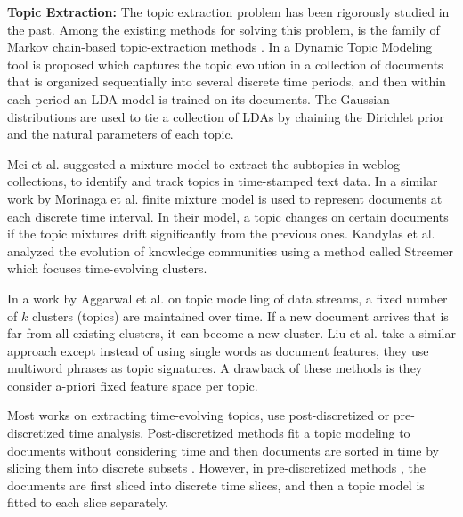 \textbf{Topic Extraction:}
The topic extraction problem has been rigorously studied in the past. Among the existing methods for solving
this problem, is the family of Markov chain-based topic-extraction methods
\cite{blei2006dynamic,wei2007dynamic,zhang2010evolutionary,ren2008dynamic,ahmed2012timeline}.
In \cite{blei2006dynamic} a Dynamic Topic Modeling tool is proposed which captures the topic evolution
in a collection of documents that is organized sequentially into several discrete time periods, and then
within each period an LDA model is trained on its documents. The Gaussian distributions are used to tie a collection of LDAs by chaining the Dirichlet prior and the natural parameters of each topic.

Mei et al. \cite{Mei:2005:DET} suggested a mixture model to extract the subtopics in weblog collections, to identify and 
track topics in time-stamped text data. In a similar work by Morinaga et al. \cite{Morinaga:2004:TDT} finite mixture
model is used to represent documents at each discrete time interval. In their model, a topic changes on certain documents
if the topic mixtures drift significantly from the previous ones. Kandylas et al. \cite{kandylas2008finding} analyzed the
evolution of knowledge communities using a method called Streemer which focuses time-evolving clusters.

In a work by Aggarwal et al. \cite{aggarwal2006framework} on topic modelling of data streams, a fixed number of
$k$ clusters (topics) are maintained over time. If a new document arrives that is far from all existing clusters, it can
become a new cluster. Liu et al. \cite{liu2008clustering} take a similar approach except instead of using single words as
document features, they use multiword phrases as topic signatures. A drawback of these methods is they consider a-priori
fixed feature space per topic. 

Most works on extracting time-evolving topics, use post-discretized or pre-discretized time analysis. Post-discretized
methods fit a topic modeling to documents without considering time and then documents are sorted in time by slicing them
into discrete subsets \cite{griffiths2004finding}. However, in pre-discretized methods \cite{wang2005group, song2005modeling},
the documents are first sliced into discrete time slices, and then a topic model is fitted to each slice separately. 

